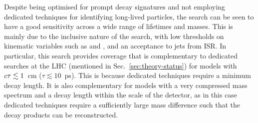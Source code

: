 Despite being optimised for prompt decay signatures and not employing dedicated 
techniques for identifying long-lived particles, the search can be seen to have 
a good sensitivity across a wide range of lifetimes and masses. This is mainly 
due to the inclusive nature of the search, with low thresholds on kinematic 
variables such as \scalht and \njet, and an acceptance to jets from ISR.
In particular, this search provides coverage that is complementary to dedicated 
searches at the LHC (mentioned in Sec.~\ref{sec:theory-status}) for models with 
$c\tau \lesssim 1$~cm ($\tau \lesssim 10$~ps). This is because dedicated 
techniques require a minimum decay length. 
It is also complementary for models with a very compressed mass spectrum and a 
decay length within the scale of the detector, as in this case dedicated 
techniques require a sufficiently large mass difference such that the decay 
products can be reconstructed.



